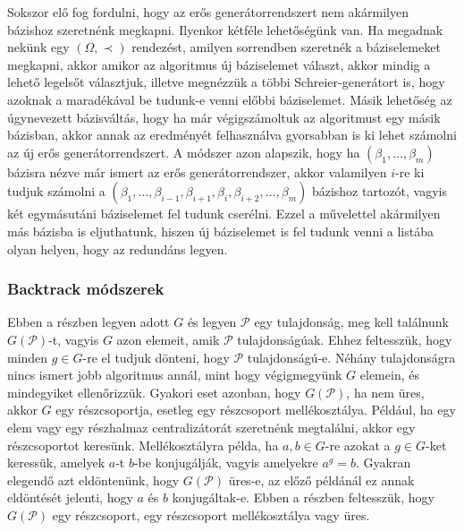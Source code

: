 Sokszor elő fog fordulni, hogy az erős generátorrendszert nem akármilyen bázishoz szeretnénk megkapni.
Ilyenkor kétféle lehetőségünk van.
Ha megadnak nekünk egy $(\Omega, \prec)$ rendezést, amilyen sorrendben szeretnék a báziselemeket megkapni, akkor amikor az algoritmus új báziselemet választ, akkor mindig a lehető legelsőt választjuk,
illetve megnézzük a többi Schreier-generátort is, hogy azoknak a maradékával be tudunk-e venni előbbi báziselemet.
Másik lehetőség az úgynevezett bázisváltás, hogy ha már végigszámoltuk az algoritmust egy másik bázisban, akkor annak az eredményét felhasználva gyorsabban is ki lehet számolni az új erős generátorrendszert.
A módszer azon alapszik, hogy ha $(\beta_1, \dots, \beta_m)$ bázisra nézve már ismert az erős generátorrendszer, akkor valamilyen $i$-re ki tudjuk számolni a $(\beta_1, \dots, \beta_{i-1}, \beta_{i+1}, \beta_i, \beta_{i+2}, \dots, \beta_m)$
bázishoz tartozót, vagyis két egymásutáni báziselemet fel tudunk cserélni.
Ezzel a művelettel akármilyen más bázisba is eljuthatunk, hiszen új báziselemet is fel tudunk venni a listába olyan helyen, hogy az redundáns legyen.

\subsubsection{Backtrack módszerek}
\label{subsubsec:permbt}
Ebben a részben legyen adott $G$ és legyen $\mathcal{P}$ egy tulajdonság, meg kell találnunk $G(\mathcal{P})$-t, vagyis $G$ azon elemeit, amik $\mathcal{P}$ tulajdonságúak.
Ehhez feltesszük, hogy minden $g \in G$-re el tudjuk dönteni, hogy $\mathcal{P}$ tulajdonságú-e.
Néhány tulajdonságra nincs ismert jobb algoritmus annál, mint hogy végigmegyünk $G$ elemein, és mindegyiket ellenőrizzük.
Gyakori eset azonban, hogy $G(\mathcal{P})$, ha nem üres, akkor $G$ egy részcsoportja, esetleg egy részcsoport mellékosztálya.
Például, ha egy elem vagy egy részhalmaz centralizátorát szeretnénk megtalálni, akkor egy részcsoportot keresünk.
Mellékosztályra példa, ha $a, b \in G$-re azokat a $g \in G$-ket keressük, amelyek $a$-t $b$-be konjugálják, vagyis amelyekre $a^g = b$.
Gyakran elegendő azt eldöntenünk, hogy $G(\mathcal{P})$ üres-e, az előző példánál ez annak eldöntését jelenti, hogy $a$ és $b$ konjugáltak-e.
Ebben a részben feltesszük, hogy $G(\mathcal{P})$ egy részcsoport, egy részcsoport mellékosztálya vagy üres.

